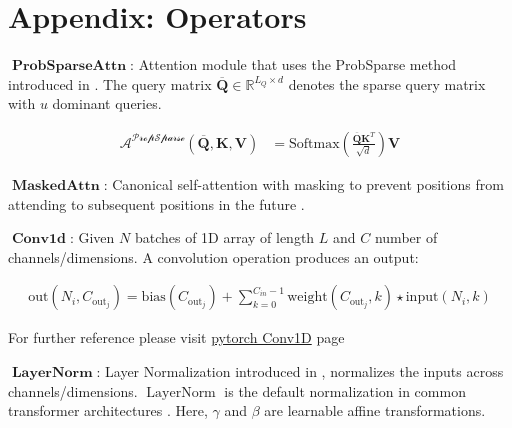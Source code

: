 \newpage

\section{Appendix: Operators}

$\operatorname{\textbf{ProbSparseAttn}}$: Attention module that uses the ProbSparse method introduced in \cite{zhou2020informer}. The query matrix $\overline{\boldsymbol{Q}} \in \mathbb{R}^{L_Q \times d}$ denotes the sparse query matrix with $u$ dominant queries.

\begin{equation}
\begin{aligned}
  \mathcal{A^{\text{PropSparse}}}(\boldsymbol{\overline{Q}}, \boldsymbol{K}, \boldsymbol{V}) &= \text{Softmax}(\frac{\boldsymbol{\overline{Q}}\boldsymbol{K}^T}{\sqrt{d}})\boldsymbol{V}
\end{aligned}
\label{eqn:probattn}
\end{equation}


$\operatorname{\textbf{MaskedAttn}}$: Canonical self-attention with masking to prevent positions from attending to subsequent positions in the future \cite{vaswani2017attention}.

$\operatorname{\textbf{Conv1d}}$: Given $N$ batches of 1D array of length $L$ and $C$ number of channels/dimensions. A convolution operation produces an output: 

\begin{equation}
\begin{aligned}
    \text{out}(N_i, C_{\text{out}_j}) = \text{bias}(C_{\text{out}_j}) +
        \sum_{k = 0}^{C_{in} - 1} \text{weight}(C_{\text{out}_j}, k)
        \star \text{input}(N_i, k)
\end{aligned}
\label{eqn:conv1d}
\end{equation}

For further reference please visit \href{https://pytorch.org/docs/stable/generated/torch.nn.Conv1d.html}{pytorch Conv1D} page 


$\operatorname{\textbf{LayerNorm}}$: Layer Normalization introduced in \cite{layernorm}, normalizes the inputs across channels/dimensions. $\operatorname{LayerNorm}$ is the default normalization in common transformer architectures \cite{vaswani2017attention}. Here, $\gamma$ and $\beta$ are learnable affine transformations.


